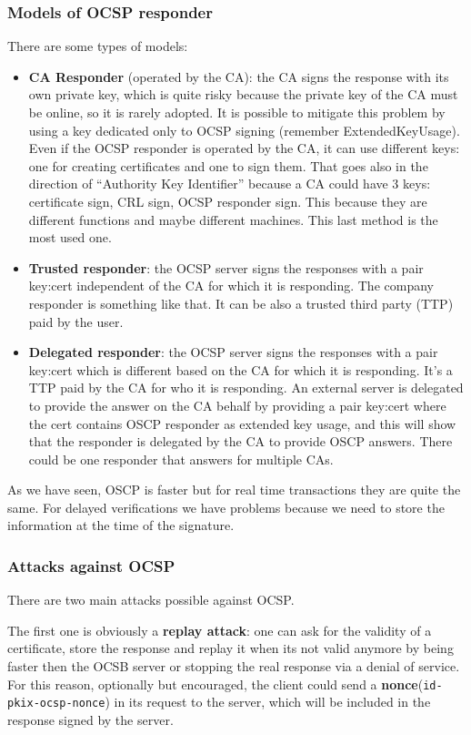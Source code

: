 \subsubsection{Models of OCSP responder}
There are some types of models:
\begin{itemize}
  \item \textbf{CA Responder} (operated by the CA): the CA signs the
    response with its own private key, which is quite risky because
    the private key of the CA must be online, so it is rarely adopted.
    It is possible to mitigate this problem by using a key dedicated
    only to OCSP signing (remember ExtendedKeyUsage). Even if the OCSP
    responder is operated by the CA, it can use different keys: one
    for creating certificates and one to sign them. That goes also in
    the direction of “Authority Key Identifier” because a CA could
    have 3 keys: certificate sign, CRL sign, OCSP responder sign. This
    because they are different functions and maybe different machines.
    This last method is the most used one.
  \item \textbf{Trusted responder}: the OCSP server signs the
    responses with a pair key:cert independent of the CA for which it
    is responding. The company responder is something like that. It
    can be also a trusted third party (TTP) paid by the user.
  \item \textbf{Delegated responder}: the OCSP server signs the
    responses with a pair key:cert which is different based on the CA
    for which it is responding. It’s a TTP paid by the CA for who it is
    responding. An external server is delegated to provide the answer on
    the CA behalf by providing a pair key:cert where the cert contains
    OSCP responder as extended key usage, and this will show that the
    responder is delegated by the CA to provide OSCP answers. There
    could be one responder that answers for multiple CAs.
\end{itemize}
As we have seen, OSCP is faster but for real time transactions they
are quite the same. For delayed verifications we have problems because
we need to store the information at the time of the signature.
\subsubsection{Attacks against OCSP}
There are two main attacks possible against OCSP.

The first one is obviously a \textbf{replay attack}: one can ask for 
the validity of a certificate, store the response and replay it when
its not valid anymore by being faster then the OCSB server or stopping
the real response via a denial of service. For this reason, optionally
but encouraged, the client could send a
\textbf{nonce}(\texttt{id-pkix-ocsp-nonce}) in its request to the
server, which will be included in the response signed by the server.

